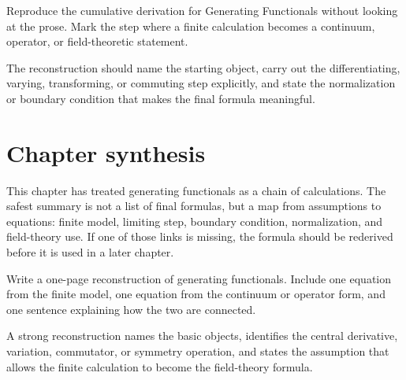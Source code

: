 \begin{exercise}
Reproduce the cumulative derivation for Generating Functionals without looking at the prose.  Mark the step where a finite calculation becomes a continuum, operator, or field-theoretic statement.
\begin{answer}
The reconstruction should name the starting object, carry out the differentiating, varying, transforming, or commuting step explicitly, and state the normalization or boundary condition that makes the final formula meaningful.
\end{answer}
\end{exercise}



\section{Chapter synthesis}

This chapter has treated generating functionals as a chain of calculations.  The safest summary is not a list of final formulas, but a map from assumptions to equations: finite model, limiting step, boundary condition, normalization, and field-theory use.  If one of those links is missing, the formula should be rederived before it is used in a later chapter.

\begin{exercise}
Write a one-page reconstruction of generating functionals.  Include one equation from the finite model, one equation from the continuum or operator form, and one sentence explaining how the two are connected.
\begin{answer}
A strong reconstruction names the basic objects, identifies the central derivative, variation, commutator, or symmetry operation, and states the assumption that allows the finite calculation to become the field-theory formula.
\end{answer}
\end{exercise}
